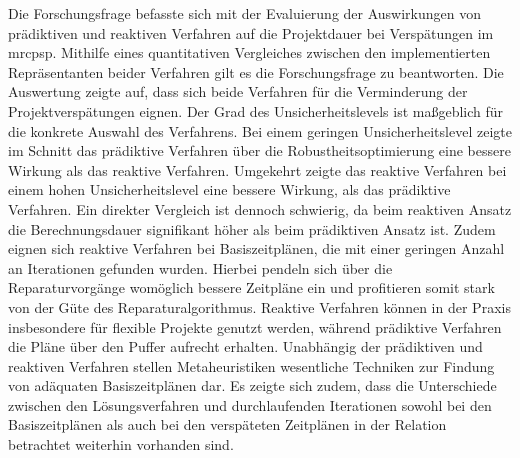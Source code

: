 Die Forschungsfrage befasste sich mit der Evaluierung der Auswirkungen von prädiktiven und reaktiven Verfahren auf die Projektdauer bei Verspätungen im \ac{mrcpsp}. Mithilfe eines quantitativen Vergleiches zwischen den implementierten Repräsentanten beider Verfahren gilt es die Forschungsfrage zu beantworten. Die Auswertung zeigte auf, dass sich beide Verfahren für die Verminderung der Projektverspätungen eignen. Der Grad des Unsicherheitslevels ist maßgeblich für die konkrete Auswahl des Verfahrens. Bei einem geringen Unsicherheitslevel zeigte im Schnitt das prädiktive Verfahren über die Robustheitsoptimierung eine bessere Wirkung als das reaktive Verfahren. Umgekehrt zeigte das reaktive Verfahren bei einem hohen Unsicherheitslevel eine bessere Wirkung, als das prädiktive Verfahren. Ein direkter Vergleich ist dennoch schwierig, da beim reaktiven Ansatz die Berechnungsdauer signifikant höher als beim prädiktiven Ansatz ist. Zudem eignen sich reaktive Verfahren bei Basiszeitplänen, die mit einer geringen Anzahl an Iterationen gefunden wurden. Hierbei pendeln sich über die Reparaturvorgänge womöglich bessere Zeitpläne ein und profitieren somit stark von der Güte des Reparaturalgorithmus. Reaktive Verfahren können in der Praxis insbesondere für flexible Projekte genutzt werden, während prädiktive Verfahren die Pläne über den Puffer aufrecht erhalten. Unabhängig der prädiktiven und reaktiven Verfahren stellen Metaheuristiken wesentliche Techniken zur Findung von adäquaten Basiszeitplänen dar. Es zeigte sich zudem, dass die Unterschiede zwischen den Lösungsverfahren und durchlaufenden Iterationen sowohl bei den Basiszeitplänen als auch bei den verspäteten Zeitplänen in der Relation betrachtet weiterhin vorhanden sind. 


